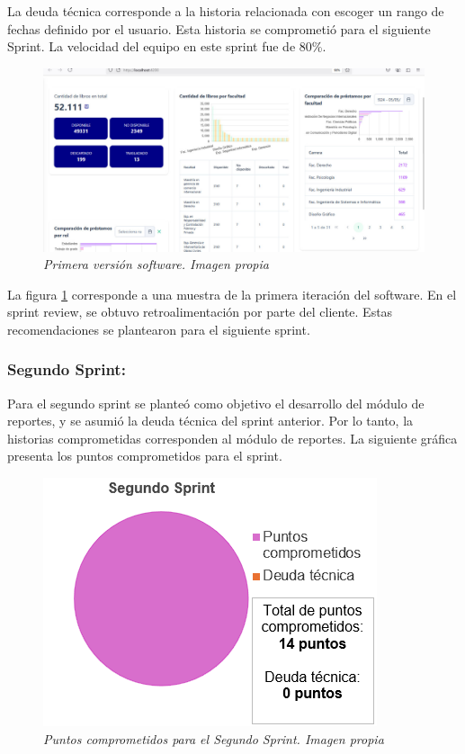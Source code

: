 \documentclass[spanish]{ieee_upb}
\begin{document}
La deuda técnica corresponde a la historia relacionada con escoger un rango de fechas definido por el usuario. Esta historia se comprometió para el siguiente Sprint. 
La velocidad del equipo en este sprint fue de 80\%.

\begin{figure}[htpb] 
	\centering
	\includegraphics[width=0.8\linewidth]{img/UX/s1-1.jpg}
	\vspace{-1mm}
	\caption[Primera versión software]{\textit{Primera versión software. Imagen propia}}
	\label{fig:S1-1} 
\end{figure}

La figura \ref{fig:S1-1} corresponde a una muestra de la primera iteración del software. En el sprint review, se obtuvo retroalimentación
por parte del cliente. Estas recomendaciones se plantearon para el siguiente sprint. 


\subsubsection{Segundo Sprint: }

 Para el segundo sprint se planteó como objetivo el desarrollo del módulo de reportes, y se asumió la deuda técnica del sprint anterior. Por lo tanto, 
 la historias comprometidas corresponden al módulo de reportes. La siguiente gráfica presenta los puntos comprometidos para el sprint.


\begin{figure}[htpb] 
	\centering
	\includegraphics[width=0.4\linewidth]{img/Sprints/S2.png}
	\vspace{-1mm}
	\caption[Puntos comprometidos segundo Sprint]{\textit{Puntos comprometidos para el Segundo Sprint. Imagen propia}}
	\label{fig:S2} 
\end{figure}
\end{document}
